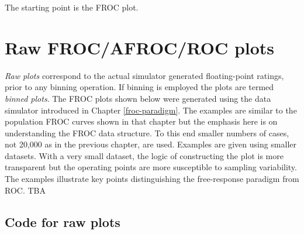 \documentclass[
]{book}
\begin{document}
The starting point is the FROC plot.

\hypertarget{raw-frocafrocroc-plots}{%
\section{Raw FROC/AFROC/ROC plots}\label{raw-frocafrocroc-plots}}

\emph{Raw plots} correspond to the actual simulator generated floating-point ratings, prior to any binning operation. If binning is employed the plots are termed \emph{binned plots}. The FROC plots shown below were generated using the data simulator introduced in Chapter \ref{froc-paradigm}. The examples are similar to the population FROC curves shown in that chapter but the emphasis here is on understanding the FROC data structure. To this end smaller numbers of cases, not 20,000 as in the previous chapter, are used. Examples are given using smaller datasets. With a very small dataset, the logic of constructing the plot is more transparent but the operating points are more susceptible to sampling variability. The examples illustrate key points distinguishing the free-response paradigm from ROC. TBA

\hypertarget{froc-empirical-examples-raw-plots-code1}{%
\subsection{Code for raw plots}\label{froc-empirical-examples-raw-plots-code1}}
\end{document}
